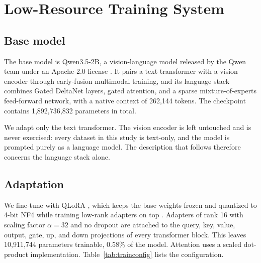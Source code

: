 \section{Low-Resource Training System}

\subsection{Base model}
The base model is Qwen3.5-2B, a vision-language model released by the Qwen team under an Apache-2.0 license \citep{qwen3_5}. It pairs a text transformer with a vision encoder through early-fusion multimodal training, and its language stack combines Gated DeltaNet layers, gated attention, and a sparse mixture-of-experts feed-forward network, with a native context of 262{,}144 tokens. The checkpoint contains 1{,}892{,}736{,}832 parameters in total.

We adapt only the text transformer. The vision encoder is left untouched and is never exercised: every dataset in this study is text-only, and the model is prompted purely as a language model. The description that follows therefore concerns the language stack alone.

\subsection{Adaptation}
We fine-tune with QLoRA \citep{dettmers2023qlora}, which keeps the base weights frozen and quantized to 4-bit NF4 while training low-rank adapters on top \citep{hu2021lora}. Adapters of rank 16 with scaling factor $\alpha = 32$ and no dropout are attached to the query, key, value, output, gate, up, and down projections of every transformer block. This leaves 10{,}911{,}744 parameters trainable, 0.58\% of the model. Attention uses a scaled dot-product implementation. Table~\ref{tab:trainconfig} lists the configuration.

